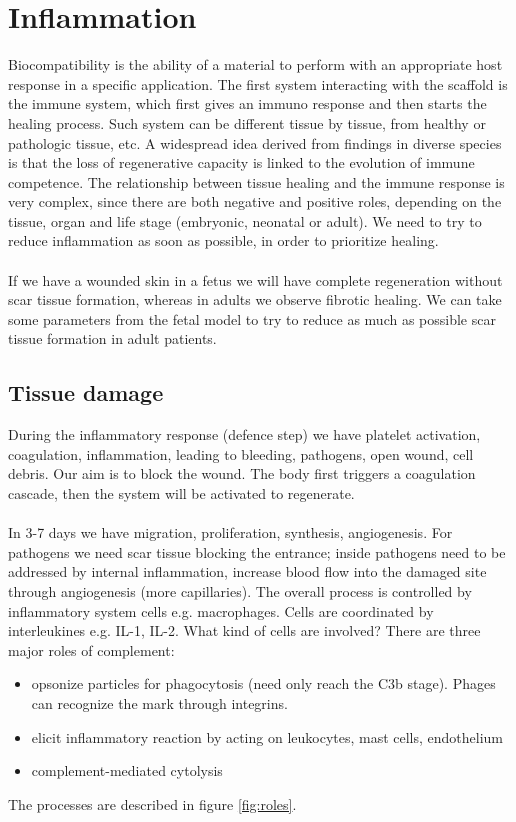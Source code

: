 \graphicspath{{chapters/04/images/}}
\chapter{Inflammation}

Biocompatibility is the ability of a material to perform with an appropriate host response in a specific application.
The first system interacting with the scaffold is the immune system, which first gives an immuno response and then starts the healing process.
Such system can be different tissue by tissue, from healthy or pathologic tissue, etc.
A widespread idea derived from findings in diverse species is that the loss of regenerative capacity is linked to the evolution of immune competence.
The relationship between tissue healing and the immune response is very complex, since there are both negative and positive roles, depending on the tissue, organ and life stage (embryonic, neonatal or adult). We need to try to reduce inflammation as soon as possible, in order to prioritize healing.
\\
\\
\noindent
If we have a wounded skin in a fetus we will have complete regeneration without scar tissue formation, whereas in adults we observe fibrotic healing. We can take some parameters from the fetal model to try to reduce as much as possible scar tissue formation in adult patients.

\section{Tissue damage}
During the inflammatory response (defence step) we have platelet activation, coagulation, inflammation, leading to bleeding, pathogens, open wound, cell debris.
Our aim is to block the wound.
The body first triggers a coagulation cascade, then the system will be activated to regenerate.
\\
\\
\noindent
In 3-7 days we have migration, proliferation, synthesis, angiogenesis.
For pathogens we need scar tissue blocking the entrance; inside pathogens need to be addressed by internal inflammation, increase blood flow into the damaged site through angiogenesis (more capillaries).
The overall process is controlled by inflammatory system cells e.g. macrophages.
Cells are coordinated by interleukines e.g. IL-1, IL-2.
\noindent
What kind of cells are involved? There are three major roles of complement:
\begin{itemize}
\item opsonize particles for phagocytosis (need only reach the C3b stage). Phages can recognize the mark through integrins.
\item elicit inflammatory reaction by acting on leukocytes, mast cells, endothelium
\item complement-mediated cytolysis
\end{itemize}
\noindent
The processes are described in figure \ref{fig:roles}.

